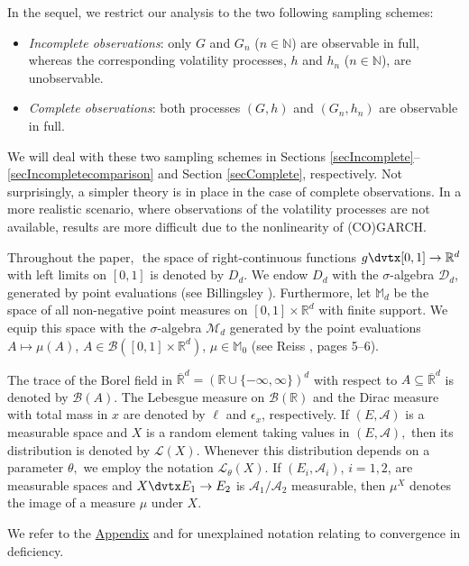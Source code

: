 \documentclass[number,citesort,seceqn,dvips]{arxbj}
\newcommand{\RR}{\mathbb{R}}
\newcommand{\NN}{\mathbb{N}}
\newcommand{\MM}{\mathbb{M}}
\newcommand{\MMM}{{\mathcal M}}
\newcommand{\AAA}{{\mathcal A}}
\newcommand{\BBB}{{\mathcal B}}
\newcommand{\DDD}{{\mathcal D}}
\newcommand{\LLL}{{\mathcal L}}
\begin{document}
In the sequel, we restrict our analysis to the two following sampling
schemes:
%
\begin{itemize}
%
\item \textit{Incomplete observations}: only $G$ and $G_n$ ($n\in\NN$) are
observable in full, whereas the corresponding volatility processes, $h$
and $h_n$ ($n\in\NN$), are unobservable.
%
\item \textit{Complete
observations}: both processes $(G,h)$ and $(G_n,h_n)$ are observable in
full.
\end{itemize}
%
We will deal with these two sampling schemes in
Sections \ref{secIncomplete}--\ref{secIncompletecomparison} and
Section \ref{secComplete}, respectively. Not surprisingly, a simpler
theory is in place in the case of complete observations. In a more
realistic scenario, where observations of the volatility processes are
not available, results are more difficult due to the nonlinearity of
(CO)GARCH.

Throughout the paper, $ $ the space of right-continuous functions
$g\dvtx[0,1]\to\RR^d$ with left limits on $[0,1]$ is denoted by $D_d$. We
endow $D_d$ with the $\sigma$-algebra $\DDD_d$, generated by point
evaluations (see Billingsley \cite{Bi68}). Furthermore, let
$\MM_d$ be the space of all non-negative point measures on
$[0,1]\times\RR^d$ with finite support. We equip this space with the
$\sigma$-algebra $\MMM_d$ generated by the point evaluations
$A\mapsto
\mu(A)$, $A\in\BBB([0,1]\times\RR^d)$, $\mu\in\MM_0$ (see
Reiss \cite{Re93}, pages 5--6).

The trace of the Borel field in
$\overline{\RR}^d=(\RR\cup\{-\infty,\infty\})^d$ with respect to
$A\subseteq\overline{\RR}^d$ is denoted by $\BBB(A)$. The Lebesgue
measure on $\BBB(\RR)$ and the Dirac measure with total mass in $x$ are
denoted by $\ell$ and $\epsilon_x$, respectively. If $(E,\AAA)$ is a
measurable space and $X$ is a random element taking values in
$(E,\AAA),$ then its distribution is denoted by $\LLL(X)$. Whenever
this distribution depends on a parameter $\theta,$ we employ the
notation $\LLL_\theta(X)$. If $(E_i,\AAA_i)$, $i=1,2$, are measurable
spaces and $X\dvtx E_1\to E_2$ is $\AAA_1/\AAA_2$ measurable, then $\mu^X$
denotes the image of a measure $\mu$ under $X$.

We refer to the \hyperref[appendix]{Appendix} and \cite{St85} for unexplained notation
relating to convergence in deficiency.

\end{document}
